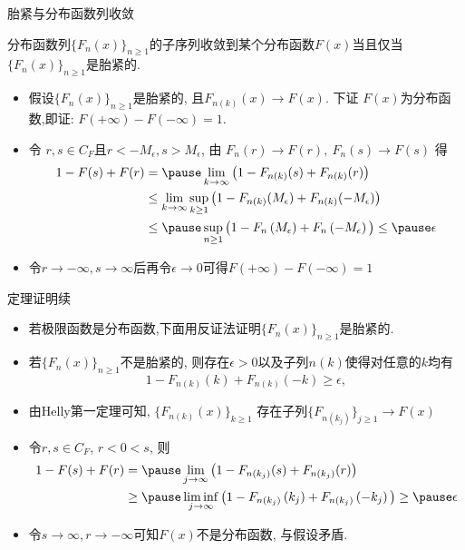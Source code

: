 \begin{frame}{胎紧与分布函数列收敛}
\begin{thm}
	分布函数列$\{F_n(x)\}_{n\geq 1}$的子序列收敛到某个分布函数$F(x)$当且仅当$\{F_n(x)\}_{n\geq 1}$是胎紧的.
 \end{thm}\pause

\zheng
\begin{itemize}[<+-|alert@+>]
\item 假设$\{F_n(x)\}_{n\geq 1}$是胎紧的, 且\( F_{n(k)}(x) \rightarrow F(x) \). 下证 $F(x)$为分布函数,\pause  即证: $F(+\infty)-F(-\infty)=1$.
\item 令 $r, s\in C_F$且\( r<-M_{\epsilon}, s>M_{\epsilon} \), 由
\(F_{n}(r) \rightarrow F(r), \ F_{n}(s) \rightarrow F(s) \)
得 \pause %
\[
\begin{aligned}
1-F(s)+F(r)  &=\pause \lim _{k \rightarrow \infty} \big(1-F_{n(k)}(s)+F_{n(k)}(r) \big)\\
& \leq\lim _{k \rightarrow \infty} \sup_{k\geq 1}\big(1-F_{n(k)}(M_{\epsilon})+F_{n(k)}(-M_{\epsilon}) \big)\\
&\leq \pause \sup_{n\geq 1} \big(1-F_{n}\left(M_{\epsilon}\right)+F_{n}\left(-M_{\epsilon}\right)\big) \leq \pause \epsilon
\end{aligned}
\]
\item 令$r\rightarrow-\infty, s\rightarrow\infty$后再令$\epsilon\rightarrow 0$可得$F(+\infty)-F(-\infty)=1$%
\end{itemize}


\end{frame}
\begin{frame}{定理证明续}
	\begin{itemize}[<+-|alert@+>]
	\item 若极限函数是分布函数,下面用反证法证明$\{F_n(x)\}_{n\geq 1}$是胎紧的.
	\item 若$\{F_n(x)\}_{n\geq 1}$不是胎紧的, 则存在$\epsilon>0$以及子列$n(k)$使得对任意的$k$均有 \pause
	\[
		1-F_{n(k)}(k)+F_{n(k)}(-k) \geq \epsilon,
		\]
		\item 由Helly第一定理可知, $\{F_{n(k)}(x)\}_{k\geq 1}$ 存在子列$\{F_{n\left(k_{j}\right)}\}_{j\geq 1}\rightarrow F(x)$
		\item 令$r, s\in C_F$, $r<0<s$, 则
	\begin{align*}
		1-F(s)+F(r)  &=\pause \lim _{j \rightarrow \infty} \big(1-F_{n\left(k_{j}\right)}(s)+F_{n\left(k_{j}\right)}(r)\big)
		 \\
		&\geq \pause \liminf _{j \rightarrow \infty} \big(1-F_{n\left(k_{j}\right)}\left(k_{j}\right)+F_{n\left(k_{j}\right)}\left(-k_{j}\right)\big) \geq \pause \epsilon
	\end{align*}
\item 令$s \rightarrow \infty, r \rightarrow-\infty$可知$F(x)$不是分布函数, 与假设矛盾. %
	\end{itemize}

\end{frame}


